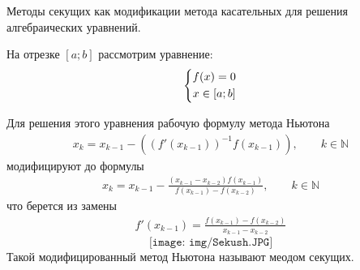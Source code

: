 \documentclass[__main__.tex]{subfiles}
\begin{document}
Методы секущих как модификации метода касательных для решения алгебраических уравнений.

На отрезке $[a;b]$ рассмотрим уравнение:
\begin{gather*}
\left\{
\begin{gathered}
f(x)=0 \hfill \\
x \in [a;b]
\end{gathered}	
\right.
\end{gather*}

Для решения этого уравнения рабочую формулу метода Ньютона
\begin{gather*}
x_k=x_{k-1}-((f'(x_{k-1}))^{-1}f(x_{k-1})), \qquad k\in \mathbb N
\end{gather*}
модифицируют до формулы 
\begin{gather*}
x_k=x_{k-1} - \frac{(x_{k-1}-x_{k-2})f(x_{k-1})}{f(x_{k-1})-f(x_{k-2})}, \qquad k \in \mathbb N
\end{gather*} 
что берется из замены 
\begin{gather*}
f'(x_{k-1})=\frac{f(x_{k-1})-f(x_{k-2})}{x_{k-1}-x_{k-2}}
\end{gather*}
$$
\texttt{[image: img/Sekush.JPG]}
$$
Такой модифицированный метод Ньютона называют меодом секущих. 
\end{document}
